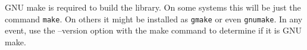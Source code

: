 

GNU make is required to build the library.  On some
systems this will be just the command \texttt{make}.  On others 
it might be installed as \texttt{gmake} or even \texttt{gnumake}.
In any event, use the --version option with the make command
to determine if it is GNU make.
